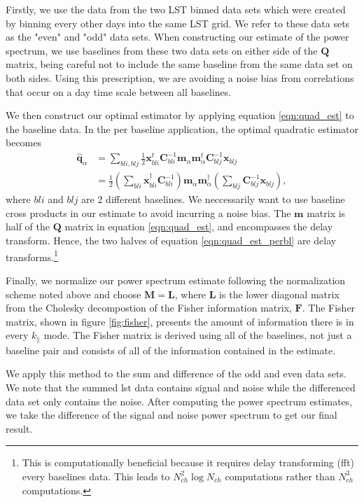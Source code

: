 \documentclass[twocolumn,numberedappendix]{emulateapj} \shorttitle{PSA64}
\newcommand{\x}{\mathbf{x}} \newcommand{\xhat}{\hat{\mathbf{x}}}
\newcommand{\C}{\mathbf{C}} \newcommand{\Q}{\mathbf{Q}}
\begin{document}
Firstly, we use the data from the two LST binned data sets which were created
by binning every other days into the same LST grid. We refer to these data sets
as the "even" and "odd" data sets. When constructing our estimate of the power
spectrum, we use baselines from these two data sets on either side of the
$\mathbf{Q}$ matrix, being careful not to include the same baseline from the
same data set on both sides. Using this prescription, we are avoiding a noise
bias from correlations that occur on a day time scale between all baselines.




We then construct our optimal estimator by applying equation \ref{eqn:quad_est}
to the baseline data. In the per baseline application, the optimal quadratic
estimator becomes 
\begin{align}\label{eqn:quad_est_perbl}
    \hat{\mathbf{q}}_{\alpha} &=
\sum_{bli,blj}{\frac{1}{2}\x_{bli}^{t}\C^{-1}_{bli}\mathbf{m}_{\alpha}\mathbf{m}_{\alpha}^{t}\C^{-1}_{blj}\x_{blj}}\\
&=
\frac{1}{2}(\sum_{bli}{\x_{bli}^{\dagger}\C_{bli}^{-1}})\mathbf{m}_{\alpha}\mathbf{m}^{\dagger}_{\alpha}(\sum_{blj}{\C_{blj}^{-1}\x_{blj}}),
\end{align}
where $bli$ and $blj$ are 2 different baselines. We neccessarily want to use
baseline cross products in our estimate to avoid incurring a noise bias. The 
$\mathbf{m}$ matrix is half of the $\Q$ matrix in equation \ref{eqn:quad_est},
and encompasses the delay transform. Hence, the two halves of equation
\ref{eqn:quad_est_perbl} are delay transforms.\footnote{This is computationally
beneficial because it requires delay transforming (fft) every baselines data.
This leads to $N_{ch}^{2}\log{N_{ch}} $ computations rather than $N_{ch}^{3}$
computations.} 

Finally, we normalize our power spectrum estimate following the normalization
scheme noted above and choose $\mathbf{M} = \mathbf{L}$, where $\mathbf{L}$ is the lower
diagonal matrix from the Cholesky decompostion of the Fisher information matrix,
$\mathbf{F}$. The Fisher matrix, shown in figure \ref{fig:fisher}, presents the amount
of information there is in every $k_{\parallel}$ mode. The Fisher matrix is
derived using all of the baselines, not just a baseline pair and consists of all
of the information contained in the estimate.

We apply this method to the sum and difference of the odd and even data sets. We
note that the summed lst data contains signal and noise while the differenced
data set only contains the noise. After computing the power spectrum estimates,
we take the difference of the signal and noise power spectrum to get our final
result. 
\end{document}
